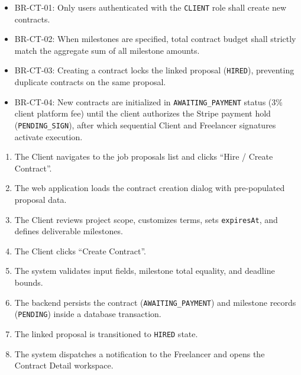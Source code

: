 \begin{itemize}[leftmargin=1.6em,topsep=3pt,itemsep=2pt,parsep=0pt,label=$\bullet$]\brrulelist
      \item BR-CT-01: Only users authenticated with the \texttt{CLIENT} role shall create new contracts.
      \item BR-CT-02: When milestones are specified, total contract budget shall strictly match the aggregate sum of all milestone amounts.
      \item BR-CT-03: Creating a contract locks the linked proposal (\texttt{HIRED}), preventing duplicate contracts on the same proposal.
      \item BR-CT-04: New contracts are initialized in \texttt{AWAITING\_PAYMENT} status (3\% client platform fee) until the client authorizes the Stripe payment hold (\texttt{PENDING\_SIGN}), after which sequential Client and Freelancer signatures activate execution.
\end{itemize}

\begin{enumerate}[leftmargin=1.8em,topsep=3pt,itemsep=2pt,parsep=0pt]
      \item The Client navigates to the job proposals list and clicks ``Hire / Create Contract''.
      \item The web application loads the contract creation dialog with pre-populated proposal data.
      \item The Client reviews project scope, customizes terms, sets \texttt{expiresAt}, and defines deliverable milestones.
      \item The Client clicks ``Create Contract''.
      \item The system validates input fields, milestone total equality, and deadline bounds.
      \item The backend persists the contract (\texttt{AWAITING\_PAYMENT}) and milestone records (\texttt{PENDING}) inside a database transaction.
      \item The linked proposal is transitioned to \texttt{HIRED} state.
      \item The system dispatches a notification to the Freelancer and opens the Contract Detail workspace.
\end{enumerate}

